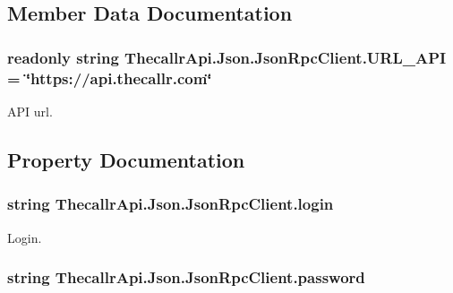 \subsection{Member Data Documentation}
\hypertarget{class_thecallr_api_1_1_json_1_1_json_rpc_client_a089929699b48b819ef921c49851da1ad}{
\subsubsection[{U\+R\+L\+\_\+\+A\+P\+I}]{\setlength{\rightskip}{0pt plus 5cm}readonly string Thecallr\+Api.\+Json.\+Json\+Rpc\+Client.\+U\+R\+L\+\_\+\+A\+P\+I = \char`\"{}https\+://api.\+thecallr.\+com\char`\"{}\hspace{0.3cm}{\ttfamily [static]}}}\label{class_thecallr_api_1_1_json_1_1_json_rpc_client_a089929699b48b819ef921c49851da1ad}


A\+P\+I url. 



\subsection{Property Documentation}
\hypertarget{class_thecallr_api_1_1_json_1_1_json_rpc_client_a5abb517979932f03537abbff5007e4fa}{
\subsubsection[{login}]{\setlength{\rightskip}{0pt plus 5cm}string Thecallr\+Api.\+Json.\+Json\+Rpc\+Client.\+login\hspace{0.3cm}{\ttfamily [get]}}}\label{class_thecallr_api_1_1_json_1_1_json_rpc_client_a5abb517979932f03537abbff5007e4fa}


Login. 

\hypertarget{class_thecallr_api_1_1_json_1_1_json_rpc_client_aefa7c23e20a776ca0862d47dffab33ce}{
\subsubsection[{password}]{\setlength{\rightskip}{0pt plus 5cm}string Thecallr\+Api.\+Json.\+Json\+Rpc\+Client.\+password\hspace{0.3cm}{\ttfamily [get]}}}\label{class_thecallr_api_1_1_json_1_1_json_rpc_client_aefa7c23e20a776ca0862d47dffab33ce}


